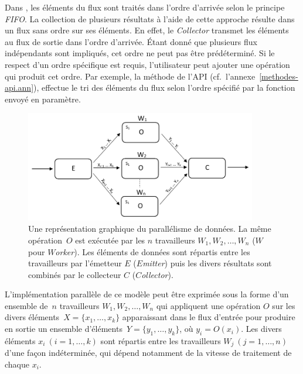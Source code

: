 Dans , les \'el\'ements du flux sont trait\'es dans l'ordre d'arriv\'ee selon le principe \emph{FIFO}. La collection de plusieurs r\'esultats \`a l'aide de cette approche r\'esulte dans un flux sans ordre sur ses \'el\'ements. En effet, le \emph{Collector} transmet les \'el\'ements au flux de sortie dans l'ordre d'arriv\'ee. \'Etant donn\'e que plusieurs flux ind\'ependants sont impliqu\'es, cet ordre ne peut pas \^etre pr\'ed\'etermin\'e. Si le respect d'un  ordre sp\'ecifique est requis, l'utilisateur peut ajouter une op\'eration qui produit cet ordre. Par exemple, la m\'ethode  de l'API (cf.~l'annexe~\ref{methodes-api.ann}), effectue le tri des \'el\'ements du flux selon l'ordre sp\'ecifi\'e par la fonction  envoy\'e en param\`etre.

\begin{figure}

\centering
     \includegraphics[width=0.9\textwidth]{Figures/DataParallelisme.pdf}
      \caption[Une repr\'esentation graphique du parall\'elisme de donn\'ees en \ppff.]{Une repr\'esentation graphique du parall\'elisme de donn\'ees. La m\^eme op\'eration~$O$ est ex\'ecut\'ee par les $n$ travailleurs $W_1, W_2,\ldots, W_n$ ($W$ pour \emph{$W$orker}). Les \'el\'ements de donn\'ees sont r\'epartis entre les travailleurs par l'\'emetteur $E$ ($E$\emph{mitter}) puis les divers r\'esultats sont combin\'es par le collecteur $C$ ($C$\emph{ollector}).}
       \label{DataParallelisme.fig}
\end{figure}


L'impl\'ementation parall\`ele de ce mod\`ele peut \^etre
exprim\'ee sous la forme d'un ensemble de~$n$ travailleurs $W_1, W_2,\ldots, W_n$ qui
appliquent une op\'eration $O$ sur les divers \'el\'ements~$X = \{x_1, \ldots, x_k\}$ apparaissant dans
le flux d'entr\'ee pour produire en sortie un ensemble d'\'el\'ements~$Y = \{y_1, \ldots, y_k\}$, o\`u $y_i = O(x_i)$.
%
Les divers \'el\'ements $x_i~(i=1, \ldots, k)$ sont r\'epartis entre
les travailleurs $W_j~(j=1, \ldots, n)$ d'une fa\c{c}on
ind\'etermin\'ee, qui d\'epend notamment de la vitesse de traitement
de chaque $x_i$.
%

